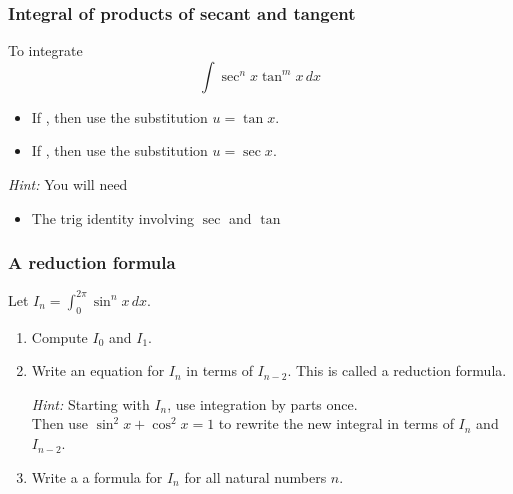 \documentclass[14pt]{beamer}
\begin{document}
\begin{frame}[t]
	\frametitle{Integral of products of secant and tangent}

	To integrate
	\[
		\int \sec^{n}x \tan^{m}x \, dx
	\]
	\begin{itemize}
		\item If \boxed{\phantom{spacespace}}, then use the substitution $\displaystyle
			u = \tan x$.

		\item If \boxed{\phantom{spacespace}}, then use the substitution $\displaystyle
			u = \sec x$.
	\end{itemize}

	\vfill

	{\fontsize{13}{13}\selectfont \emph{Hint:} You will need \begin{itemize}\begin{multicols}{2}\item $\displaystyle \frac{d}{dx}\left[ \tan x \right] = \ldots$ \item $\displaystyle \frac{d}{dx}\left[ \sec x \right] = \ldots$\end{multicols}

	\item The trig identity involving $\sec$ and $\tan$\end{itemize} }
\end{frame}

\begin{frame}[t]
	\fontsize{13}{13}\selectfont
	\frametitle{A reduction formula}

	Let $\displaystyle I_{n}= \int_{0}^{2\pi}\sin^{n}x \, dx$.
	\vspace{.3cm}

	\begin{enumerate}
		\item Compute $I_{0}$ and $I_{1}$.
			\vspace{.3cm}

		\item Write an equation for $\displaystyle I_{n}$ in terms of $\displaystyle
			I_{n-2}$. This is called a reduction formula.
			\vspace{.3cm}

			\emph{Hint:} Starting with $I_{n}$, use integration by parts once. \\ Then
			use $\displaystyle \sin^{2}x + \cos^{2}x = 1$ to rewrite the new integral in
			terms of $\displaystyle I_{n}$ and $\displaystyle I_{n-2}$.
			\vspace{.3cm}

		\item Write a a formula for $I_{n}$ for all natural numbers $n$.

	\end{enumerate}
\end{frame}
\end{document}
